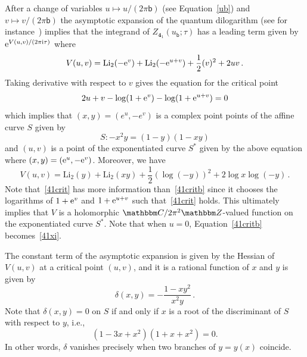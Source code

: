 \documentclass[12pt,reqno]{amsart}
\theoremstyle{definition}
\def\BZ{\mathbbm Z}
\def\BC{\mathbbm C}
\def\Li{\mathrm{Li}}
\def\bb{\mathsf{b}}
\def\ri{\mathrm{i}}
\def\re{{\rm e}}
\def\ri{{\rm i}}
\def\ub{u_{\mathsf{b}}}
\def\md{\mathbf}
\newcommand{\knot}[1]{\md{#1}}
\begin{document}
After a change of variables $u \mapsto u/(2\pi \bb)$ (see
Equation~\eqref{ub}) and $v \mapsto v/(2\pi\bb)$ 
the asymptotic expansion of the quantum dilogarithm (see for
instance~\cite[Prop.6]{AK}) implies that the
integrand of $Z_{\knot{4}_1}(\ub;\tau)$ has a leading term given by
$\re^{V(u,v)/(2 \pi \ri \tau)}$ where
\begin{equation}
  \label{V41}
  V(u,v) = \Li_2(-\re^{v}) + \Li_2(-\re^{u+v})
  + \frac{1}{2} (v)^2 + 2 u v \,.
\end{equation}
Taking derivative with respect to $v$ gives the equation for the
critical point
\begin{equation}
  \label{41crit}
  2 u + v - \log(1+\re^{v}) -\log(1+\re^{u+v})=0
\end{equation}
which implies that $(x,y)=(e^u,-e^v)$ is a complex point 
points of the affine curve $S$ given by
\begin{equation}
  \label{41critb}
  S : -x^2 y = (1-y)(1- x y) %
\end{equation}
and $(u, v)$ is a point of the exponentiated curve $S^*$ given by
the above equation where $(x,y)=(\re^{u},-\re^{v})$.  Moreover, we
have
\begin{equation}
  \label{V41b}
  V(u,v) = \Li_2(y)+\Li_2(xy) +\frac{1}{2} (\log (-y))^2 + 2 \log x \log(-y) \,.
\end{equation}
Note that~\eqref{41crit} has more information than~\eqref{41critb}
since it chooses the logarithms of $1+\re^{v}$ and $1+\re^{u+v}$
such that~\eqref{41crit} holds. This ultimately implies that $V$ is a
holomorphic $\BC/2\pi^2\BZ$-valued function on the exponentiated curve
$S^*$. Note that when $u=0$, Equation~\eqref{41critb}
becomes~\eqref{41xi}.

The constant term of the asymptotic expansion is given by the Hessian
of $V(u,v)$ at a critical point $(u,v)$, and it is a rational
function of $x$ and $y$ is given by
\begin{equation}
  \label{41delta}
  \delta(x,y) = -\frac{1-xy^2}{x^2y} \,.
\end{equation}
Note that $\delta(x,y)=0$ on $S$ if and only if $x$ is a root of the
discriminant of $S$ with respect to $y$, i.e.,
\begin{equation}
  (1 - 3 x + x^2) (1 + x + x^2)=0.
  \label{disc41y}
\end{equation}
In other words, $\delta$ vanishes precisely when two branches of
$y=y(x)$ coincide.
\end{document}
